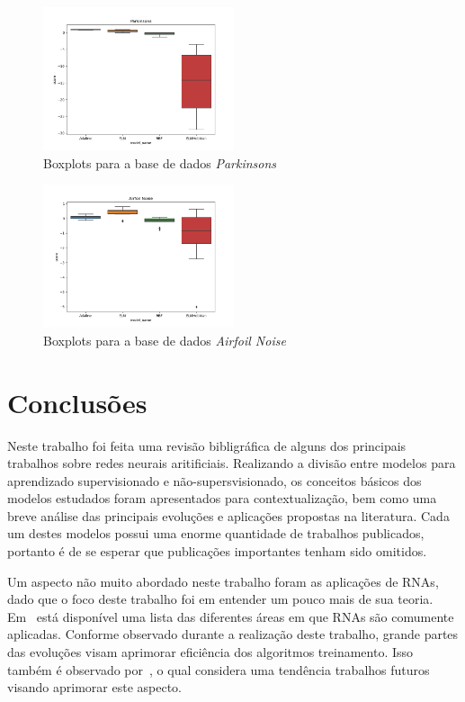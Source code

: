 \documentclass[conference]{IEEEtran}
\begin{document}
	\begin{figure}[thpbh]
		\centering
		\includegraphics[width=0.5\textwidth]{figures/Parkinsons_scores.png}
		\caption{Boxplots para a base de dados \textit{Parkinsons}}
		\label{fig:box-Parkinsons}
	\end{figure}
	
	\begin{figure}[thpbh]
		\centering
		\includegraphics[width=0.5\textwidth]{figures/Airfoil Noise_scores.png}
		\caption{Boxplots para a base de dados \textit{Airfoil Noise}}
		\label{fig:box-Airfoil-Noise}
	\end{figure}	
	
	\section{Conclusões}
	
	Neste trabalho foi feita uma revisão bibligráfica de alguns dos principais trabalhos sobre redes neurais aritificiais. Realizando a divisão entre modelos para aprendizado supervisionado e não-supersvisionado, os conceitos básicos dos modelos estudados foram apresentados para contextualização, bem como uma breve análise das principais evoluções e aplicações propostas na literatura. Cada um destes modelos possui uma enorme quantidade de trabalhos publicados, portanto é de se esperar que publicações importantes tenham sido omitidos.
	
	Um aspecto não muito abordado neste trabalho foram as aplicações de RNAs, dado que o foco deste trabalho foi em entender um pouco mais de sua teoria. Em~\cite{abiodun2018state} está disponível uma lista das diferentes áreas em que RNAs são comumente aplicadas. Conforme observado durante a realização deste trabalho, grande partes das evoluções visam aprimorar eficiência dos algoritmos treinamento. Isso também é observado por~\cite{abiodun2018state}, o qual considera uma tendência trabalhos futuros visando aprimorar este aspecto.


    
	
	
\end{document}
